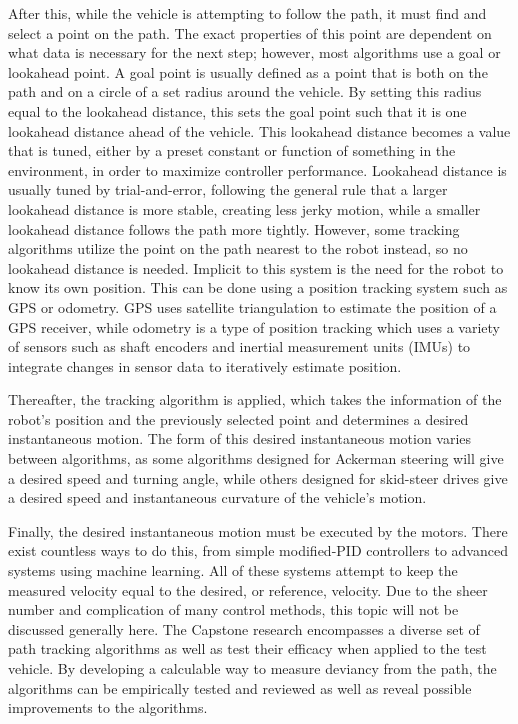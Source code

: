 \documentclass[12pt]{article}
\begin{document}
\begin{flushleft}
After this, while the vehicle is attempting to follow the path, it must find and select a point on the path. The exact properties of this point are dependent on what data is necessary for the next step; however, most algorithms use a goal or lookahead point. A goal point is usually defined as a point that is both on the path and on a circle of a set radius around the vehicle. By setting this radius equal to the lookahead distance, this sets the goal point such that it is one lookahead distance ahead of the vehicle. This lookahead distance becomes a value that is tuned, either by a preset constant or function of something in the environment, in order to maximize controller performance. Lookahead distance is usually tuned by trial-and-error, following the general rule that a larger lookahead distance is more stable, creating less jerky motion, while a smaller lookahead distance follows the path more tightly. However, some tracking algorithms utilize the point on the path nearest to the robot instead, so no lookahead distance is needed. Implicit to this system is the need for the robot to know its own position. This can be done using a position tracking system such as GPS or odometry. GPS uses satellite triangulation to estimate the position of a GPS receiver, while odometry is a type of position tracking which uses a variety of sensors such as shaft encoders and inertial measurement units (IMUs) to integrate changes in sensor data to iteratively estimate position.

Thereafter, the tracking algorithm is applied, which takes the information of the robot's position and the previously selected point and determines a desired instantaneous motion. The form of this desired instantaneous motion varies between algorithms, as some algorithms designed for Ackerman steering will give a desired speed and turning angle, while others designed for skid-steer drives give a desired speed and instantaneous curvature of the vehicle's motion.

Finally, the desired instantaneous motion must be executed by the motors. There exist countless ways to do this, from simple modified-PID controllers to advanced systems using machine learning. All of these systems attempt to keep the measured velocity equal to the desired, or reference, velocity. Due to the sheer number and complication of many control methods, this topic will not be discussed generally here. The Capstone research encompasses a diverse set of path tracking algorithms as well as test their efficacy when applied to the test vehicle. By developing a calculable way to measure deviancy from the path, the algorithms can be empirically tested and reviewed as well as reveal possible improvements to the algorithms. 


\end{flushleft}
\end{document}
